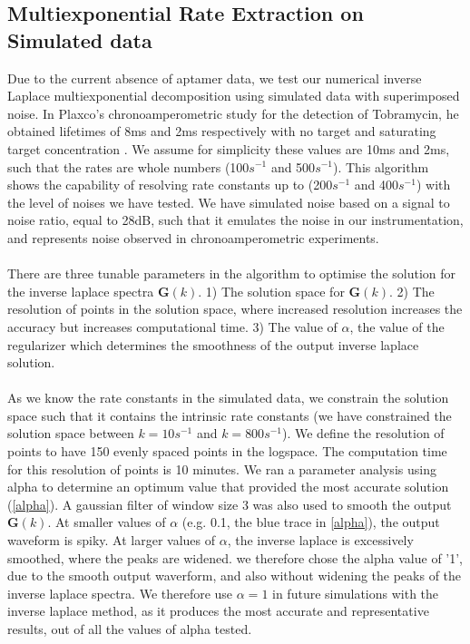 \subsection{Multiexponential Rate Extraction on Simulated data}
Due to the current absence of aptamer data, we test our numerical inverse Laplace multiexponential decomposition using simulated data with superimposed noise. In Plaxco's chronoamperometric study for the detection of Tobramycin, he obtained lifetimes of 8ms and 2ms respectively with no target and saturating target concentration \cite{arroyo2018subsecond}. We assume for simplicity these values are 10ms and 2ms, such that the rates are whole numbers (100$s^{-1}$ and 500$s^{-1}$). This algorithm shows the capability of resolving rate constants up to (200$s^{-1}$ and 400$s^{-1}$) with the level of noises we have tested. We have simulated noise based on a signal to noise ratio, equal to 28dB, such that it emulates the noise in our instrumentation, and represents noise observed in chronoamperometric experiments. \\\\
There are three tunable parameters in the algorithm to optimise the solution for the inverse laplace spectra $\mathbf{G}(k)$. 1) The solution space for $\mathbf{G}(k)$. 2) The resolution of points in the solution space, where increased resolution increases the accuracy but increases computational time. 3) The value of $\alpha$, the value of the regularizer which determines the smoothness of the output inverse laplace solution. \\\\
As we know the rate constants in the simulated data, we constrain the solution space such that it contains the intrinsic rate constants (we have constrained the solution space between $k = 10s^{-1}$ and $k = 800s^{-1}$). We define the resolution of points to have 150 evenly spaced points in the logspace. The computation time for this resolution of points is 10 minutes. We ran a parameter analysis using alpha to determine an optimum value that provided the most accurate solution (\autoref{alpha}). A gaussian filter of window size 3 was also used to smooth the output $\mathbf{G}(k)$. At smaller values of $\alpha$ (e.g. 0.1, the blue trace in \autoref{alpha}), the output waveform is spiky. At larger values of $\alpha$, the inverse laplace is excessively smoothed, where the peaks are widened. we therefore chose the alpha value of '1', due to the smooth output waverform, and also without widening the peaks of the inverse laplace spectra. We therefore use $\alpha = 1$ in future simulations with the inverse laplace method, as it produces the most accurate and representative results, out of all the values of alpha tested.\\\\
